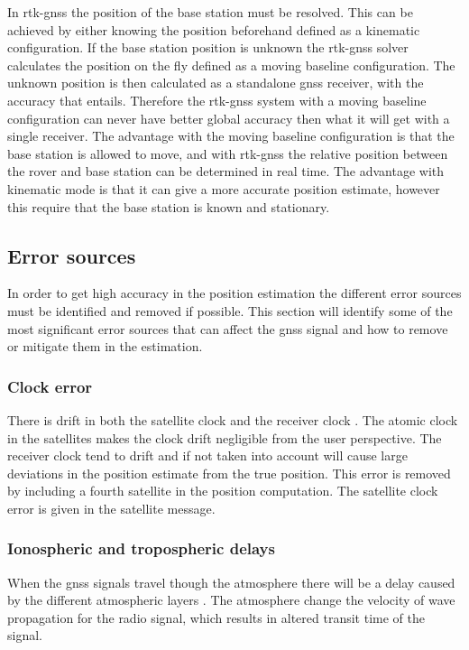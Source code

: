 In \gls{rtk-gnss} the position of the base station must be resolved. This can be achieved by either knowing the position beforehand defined as a kinematic configuration. If the base station position is unknown the \gls{rtk-gnss} solver calculates the position on the fly defined as a moving baseline configuration. The unknown position is then calculated as a standalone \gls{gnss} receiver, with the accuracy that entails. Therefore the \gls{rtk-gnss} system with a moving baseline configuration can never have better global accuracy then what it will get with a single receiver. The advantage with the moving baseline configuration is that the base station is allowed to move, and with \gls{rtk-gnss} the relative position between the rover and base station can be determined in real time. The advantage with kinematic mode is that it can give a more accurate position estimate, however this require that the base station is known and stationary.
\subsection{Error sources}
In order to get high accuracy in the position estimation the different error sources must be identified and removed if possible. This section will identify some of the most significant error sources that can affect the \gls{gnss} signal and how to remove or mitigate them in the estimation.
\subsubsection{Clock error}
There is drift in both the satellite clock and the receiver clock \citep{misra2011global}. The atomic clock in the satellites makes the clock drift negligible from the user perspective. The receiver clock tend to drift and if not taken into account will cause large deviations in the position estimate from the true position. This error is removed by including a fourth satellite in the position computation. The satellite clock error is given in the satellite message.
\subsubsection{Ionospheric and tropospheric delays}\label{Ss:Atmosphere}
When the \gls{gnss} signals travel though the atmosphere there will be a delay caused by the different atmospheric layers \citep{misra2011global}. The atmosphere change the velocity of wave propagation for the radio signal, which results in altered transit time of the signal.

